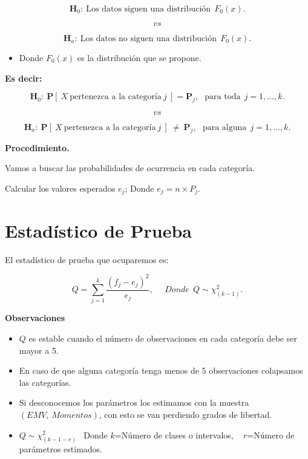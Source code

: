 \documentclass[
  a4paper,
  oneside,
  openany]{book}
\providecommand{\tightlist}{%
  \setlength{\itemsep}{0pt}\setlength{\parskip}{0pt}}
\begin{document}
\[\textbf{H}_0: \ \mbox{Los datos siguen una distribución} \ \  F_{0}(x).\]

\[vs\]

\[\textbf{H}_a: \ \mbox{Los datos no siguen una distribución} \ \ F_{0}(x).\]

\begin{itemize}
\tightlist
\item
  Donde \(F_{0}(x)\) es la distribución que se propone.
\end{itemize}

\textbf{Es decir:}

\[\textbf{H}_0: \ \mathbf{P}[\ X \ \mbox{pertenezca a la categoría} \ j \ ] = \mathbf{P}_{j},\ \ \ \mbox{para toda} \ \  j=1,\ldots,k.\]

\[vs\]

\[\textbf{H}_a: \ \mathbf{P}[ \ X \ \mbox{pertenezca a la categoría} \ j \ ] \  \neq \  \mathbf{P}_{j}, \ \ \ \mbox{para alguna} \ \ j=1,\ldots,k.\]

\textbf{Procedimiento.}

Vamos a buscar las probabilidades de ocurrencia en cada categoría.

Calcular los valores esperados \(e_{j}\); Donde \(e_{j}=n \times P_{j}.\)

\hypertarget{estaduxedstico-de-prueba-13}{%
\section{Estadístico de Prueba}\label{estaduxedstico-de-prueba-13}}

El estadístico de prueba que ocuparemos es:

\[Q= \sum_{j=1}^{k}\frac{(f_{j}-e_{j})^2}{e_{j}}, \ \ \ \ \ \ Donde\ \ Q \sim \chi^2_{(k-1)}.\]

\textbf{Observaciones}

\begin{itemize}
\item
  \(Q\) es estable cuando el número de observaciones en cada categoría debe ser mayor a 5.
\item
  En caso de que alguna categoría tenga menos de 5 observaciones colapsamos las categorías.
\item
  Si desconocemos los parámetros los estimamos con la muestra \((EMV,\  Momentos)\), con esto se van perdiendo grados de libertad.
\item
  \(Q \sim \chi^2_{(k-1-r)}\) ~Donde \(k\)=Número de clases o intervalos, ~ \(r\)=Número de parámetros estimados.
\end{itemize}
\end{document}
